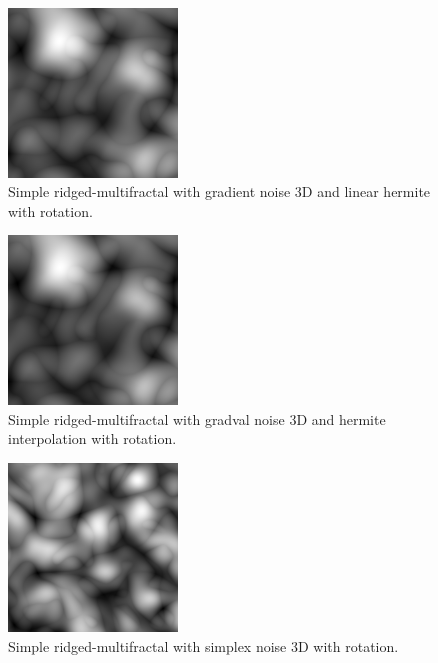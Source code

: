 \begin{figure}[h]
\centering
\includegraphics[width=0.4\textwidth]{out/simpleRidgedMultifractal3/simpleRidgedMultifractal3_gradient_noise3D_hermiteInterp_rot.png}
\caption{Simple ridged-multifractal with gradient noise 3D and linear hermite with rotation.}
\label{fig:simple_redgedmf3_gradient_noise3D_hermiteInterp_rot}
\end{figure}

\begin{figure}[h]
\centering
\includegraphics[width=0.4\textwidth]{out/simpleRidgedMultifractal3/simpleRidgedMultifractal3_gradval_noise3D_hermiteInterp_rot.png}
\caption{Simple ridged-multifractal with gradval noise 3D and hermite interpolation with rotation.}
\label{fig:simple_redgedmf3_gradval_noise3D_hermiteInterp_rot}
\end{figure}

\begin{figure}[h]
\centering
\includegraphics[width=0.4\textwidth]{out/simpleRidgedMultifractal3/simpleRidgedMultifractal3_simplex_noise3D_noInterp_rot.png}
\caption{Simple ridged-multifractal with simplex noise 3D with rotation.}
\label{fig:simple_redgedmf3_simplex_noise3D_noInterp_rot}
\end{figure}

